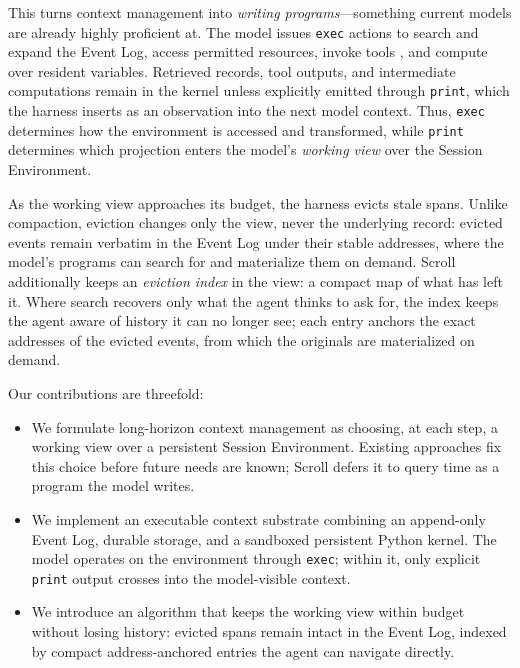 This turns context management into \emph{writing programs}---something current models are already highly proficient at. The model issues \texttt{exec} actions to search and expand the Event Log, access permitted resources, invoke tools \citep{ptc}, and compute over resident variables. Retrieved records, tool outputs, and intermediate computations remain in the kernel unless explicitly emitted through \texttt{print}, which the harness inserts as an observation into the next model context. Thus, \texttt{exec} determines how the environment is accessed and transformed, while \texttt{print} determines which projection enters the model's \emph{working view} over the Session Environment.

 As the working view approaches its budget, the harness evicts stale spans. Unlike compaction, eviction changes only the view, never the underlying record: evicted events remain verbatim in the Event Log under their stable addresses, where the model's programs can search for and materialize them on demand. 
Scroll additionally keeps an \emph{eviction index} in the view: a compact map of what has left it. Where search recovers only what the agent thinks to ask for, the index keeps the agent aware of history it can no longer see; each entry anchors the exact addresses of the evicted events, from which the originals are materialized on demand.

Our contributions are threefold:
\begin{itemize}[leftmargin=1.4em,itemsep=1pt,topsep=2pt]
    \item We formulate long-horizon context management as choosing, at each step, a working view over a persistent Session Environment. Existing approaches fix this choice before future needs are known; Scroll defers it to query time as a program the model writes.
    \item We implement an executable context substrate combining an append-only Event Log, durable storage, and a sandboxed persistent Python kernel. The model operates on the environment through \texttt{exec}; within it, only explicit \texttt{print} output crosses into the model-visible context.
    \item We introduce an algorithm that keeps the working view within budget without losing history: evicted spans remain intact in the Event Log, indexed by compact address-anchored entries the agent can navigate directly.
\end{itemize}